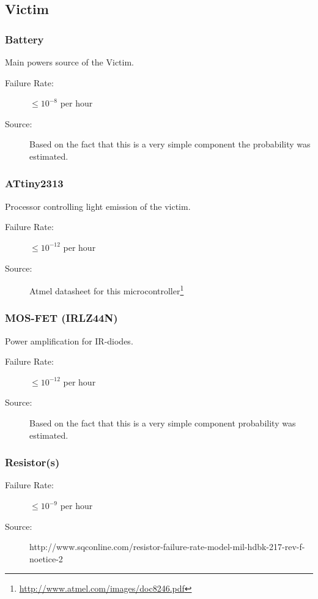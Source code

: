 \documentclass[a4paper,parskip,headheight=38pt]{scrartcl} %
\begin{document}
\subsection{Victim} %

\subsubsection{Battery}
Main powers source of the Victim.
\begin{description}
\item[Failure Rate:] $\leq 10^{-8}$ per hour
\item[Source:] Based on the fact that this is a very simple component the probability was estimated.
\end{description}

\subsubsection{ATtiny2313}
Processor controlling light emission of the victim.
\begin{description}
\item[Failure Rate:] $\leq 10^{-12}$ per hour
\item[Source:] Atmel datasheet for this microcontroller\footnote{\url{http://www.atmel.com/images/doc8246.pdf}}
\end{description}

\subsubsection{MOS-FET (IRLZ44N)}
Power amplification for IR-diodes.
\begin{description}
\item[Failure Rate:] $\leq 10^{-12}$ per hour
\item[Source:] Based on the fact that this is a very simple component probability was estimated.
\end{description}

\subsubsection{Resistor(s)}
\begin{description}
\item[Failure Rate:] $\leq 10^{-9}$ per hour
\item[Source:] http://www.sqconline.com/resistor-failure-rate-model-mil-hdbk-217-rev-f-noetice-2
\end{description}
\end{document}
